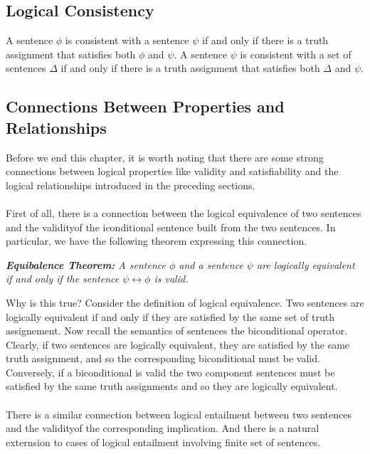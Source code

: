 \documentclass[10pt,a4pape,twocolumn]{article}
\newcounter{theo}
\begin{document}
            \subsection{Logical Consistency}
                A sentence $\phi$ is consistent with a sentence $\psi$ if and only if there is a truth assignment that satisfies both $\phi$ and $\psi$. A sentence $\psi$ is consistent with a set of sentences $\Delta$ if and only if there is a truth assignment that satisfies both $\Delta$ and $\psi$.
            \subsection{Connections Between Properties and Relationships}
                Before we end this chapter, it is worth noting that there are some strong connections between logical properties like validity and satisfiability and the logical relationships introduced in the preceding sections. 
                \\
                \\
                First of all, there is a connection between the logical equivalence of two sentences and the validityof the iconditional sentence built from the two sentences. In particular, we have the following theorem expressing this connection.    
                \begin{theorem}
                    \textit{\textbf{Equibalence Theorem:} A sentence $\phi$ and a sentence $\psi$ are logically equivalent if and only if the sentence $\psi\leftrightarrow\phi$ is valid.}
                \end{theorem}
                Why is this true? Consider the definition of logical equivalence. Two sentences are logically equivalent if and only if they are satisfied by the same set of truth assignement. Now recall the semantics of sentences the biconditional operator. Clearly, if two sentences are logically equivalent, they are satisfied by the same truth assignment, and so the corresponding biconditional must be valid. Conversely, if a biconditional is valid the two component sentences must be satisfied by the same truth assignments and so they are logically equivalent.
                \\
                \\
                There is a similar connection between logical entailment between two sentences and the validityof the corresponding implication. And there is a natural externsion to cases of logical entailment involving finite set of sentences.
\end{document}
